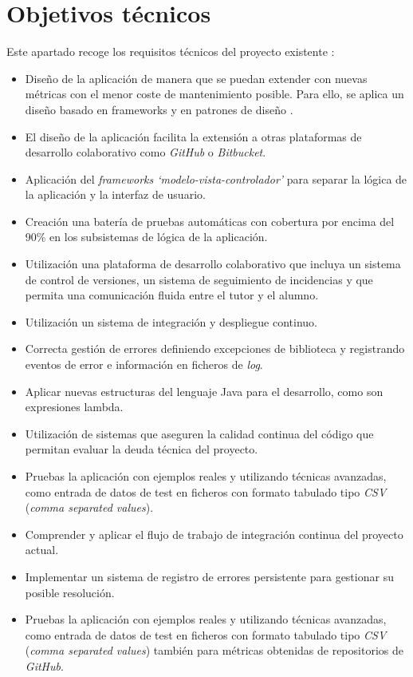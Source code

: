 \section{Objetivos técnicos}
Este apartado recoge los requisitos técnicos del proyecto existente \cite{TFGPrevio}:
\begin{itemize}
	\tightlist
	\item Diseño de la aplicación de manera que se puedan extender con nuevas métricas con el menor coste de mantenimiento posible. Para ello, se aplica un diseño basado en frameworks y en patrones de diseño \cite{gamma_patrones_2002}.
	\item El diseño de la aplicación facilita la extensión a otras plataformas de desarrollo colaborativo como \textit{GitHub} o \textit{Bitbucket}.
	\item Aplicación del \textit{frameworks `modelo-vista-controlador'} para separar la lógica de la aplicación y la interfaz de usuario.
	\item Creación una batería de pruebas automáticas con cobertura por encima del 90\% en los subsistemas de lógica de la aplicación.
	\item Utilización una plataforma de desarrollo colaborativo que incluya un sistema de control de versiones, un sistema de seguimiento de incidencias y que permita una comunicación fluida entre el tutor y el alumno.
	\item Utilización un sistema de integración y despliegue continuo.
	\item Correcta gestión de errores definiendo excepciones de biblioteca y registrando eventos de error e información en ficheros de \textit{log}. 
	\item Aplicar nuevas estructuras  del lenguaje Java para el desarrollo, como son expresiones lambda. 
	\item Utilización de sistemas que aseguren la calidad continua del código que permitan evaluar la deuda técnica del proyecto.
	\item Pruebas la aplicación con ejemplos reales y utilizando técnicas avanzadas, como entrada de datos de test en ficheros con formato tabulado tipo \textit{CSV} (\textit{comma separated values}).
	\item Comprender y aplicar el flujo de trabajo de integración continua del proyecto actual.
	\item Implementar un sistema de registro de errores persistente para gestionar su posible resolución.
	\item Pruebas la aplicación con ejemplos reales y utilizando técnicas avanzadas, como entrada de datos de test en ficheros con formato tabulado tipo \textit{CSV} (\textit{comma separated values}) también para métricas obtenidas de repositorios de \textit{GitHub}. 		
\end{itemize}


